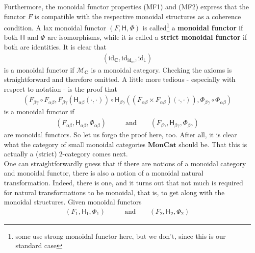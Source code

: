 Furthermore, the monoidal functor properties (MF1) and (MF2) express that the functor $F$ is compatible with the respective monoidal structures as a coherence condition.
A lax monoidal functor $(F,\mathsf{H},\Phi)$ is called\footnote{some use strong monoidal functor here, but we don't, since this is our standard case} a \textbf{monoidal functor} if both $\mathsf{H}$ and $\Phi$ are isomorphisms, while it is called a \textbf{strict monoidal functor} if both are identities.
It is clear that
\begin{align*}
  \left(
    \mathrm{id}_{\mathbf{C}},
    \mathrm{id}_{\mathrm{id}_{\mathbf{C}}},
    \mathrm{id}_{1}
  \right)
\end{align*}
is a monoidal functor if $\mathcal{M}_{\mathbf{C}}$ is a monoidal category.
Checking the axioms is straightforward and therefore omitted.
A little more tedious - especially with respect to notation - is the proof that
\begin{align*}
  \left(
    F_{\beta\gamma}
    \circ
    F_{\alpha\beta},
    F_{\beta\gamma}
    \left(
      \mathsf{H}_{\alpha\beta}(\cdot,\cdot)
    \right)
    \circ
    \mathsf{H}_{\beta\gamma}
    \left(
      \left(
        F_{\alpha\beta}
        \times
        F_{\alpha\beta}
      \right)
      (\cdot,\cdot)
    \right),
    \Phi_{\beta\gamma}
    \circ
    \Phi_{\alpha\beta}
  \right)
\end{align*}
is a monoidal functor if
\begin{align*}
  \left(
    F_{\alpha\beta},
    \mathsf{H}_{\alpha\beta},
    \Phi_{\alpha\beta}
  \right)
  \qquad
  &\text{and}
  \qquad
  \left(
    F_{\beta\gamma},
    \mathsf{H}_{\beta\gamma},
    \Phi_{\beta\gamma}
  \right)
\end{align*}
are monoidal functors.
So let us forgo the proof here, too.
After all, it is clear what the category of small monoidal categories $\mathbf{MonCat}$ should be.
That this is actually a (strict) $2$-category comes next.
\\
One can straightforwardly guess that if there are notions of a monoidal category and monoidal functor, there is also a notion of a monoidal natural transformation.
Indeed, there is one, and it turns out that not much is required for natural transformations to be monoidal, that is, to get along with the monoidal structures.
Given monoidal functors
\begin{align*}
  \left(
    F_{1},
    \mathsf{H}_{1},
    \Phi_{1}
  \right)
  \qquad
  &\text{and}
  \qquad
  \left(
    F_{2},
    \mathsf{H}_{2},
    \Phi_{2}
  \right)
\end{align*}
